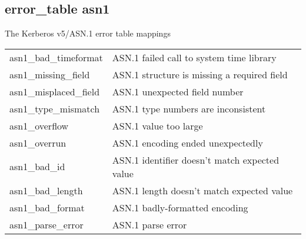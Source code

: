 \subsection{error_table asn1}

The Kerberos v5/ASN.1 error table mappings

\begin{small}
\begin{tabular}{ll}
{\sc asn1_bad_timeformat }&	ASN.1 failed call to system time library \\
{\sc asn1_missing_field }&	ASN.1 structure is missing a required field \\
{\sc asn1_misplaced_field }&	ASN.1 unexpected field number \\
{\sc asn1_type_mismatch }&	ASN.1 type numbers are inconsistent \\
{\sc asn1_overflow }&	ASN.1 value too large \\
{\sc asn1_overrun }&	ASN.1 encoding ended unexpectedly \\
{\sc asn1_bad_id }&	ASN.1 identifier doesn't match expected value \\
{\sc asn1_bad_length }&	ASN.1 length doesn't match expected value \\
{\sc asn1_bad_format }&	ASN.1 badly-formatted encoding \\
{\sc asn1_parse_error }&	ASN.1 parse error \\
\end{tabular}
\end{small}

